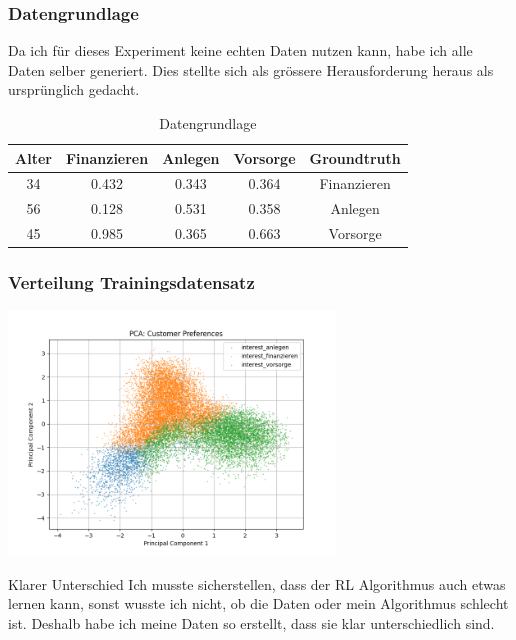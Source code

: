\documentclass{beamer}
\begin{document}
\begin{frame}  
\label{sec3}
  	\frametitle{Datengrundlage}
Da ich für dieses Experiment keine echten Daten nutzen kann, habe ich alle Daten selber generiert. Dies stellte sich als grössere Herausforderung heraus als ursprünglich gedacht.  

\begin{table}[ht]
\centering
\begin{tabular}{|c|c|c|c|c|}
\hline
Alter &  Finanzieren &  Anlegen &  Vorsorge & Groundtruth \\ \hline
 34 & 0.432 & 0.343 & 0.364 &  Finanzieren  \\ \hline
 56 & 0.128 & 0.531 & 0.358 &  Anlegen  \\ \hline
 45 & 0.985 & 0.365 & 0.663 &  Vorsorge  \\ \hline

\end{tabular}
\caption{Datengrundlage}
\end{table}
\end{frame}


\begin{frame}
\label{sec4}
  	\frametitle{Verteilung Trainingsdatensatz}
  \centering
  \includegraphics[width=0.65\textwidth]{figures/pca_groundtruth_s05.png}
  
  \begin{block}{Klarer Unterschied}
 Ich musste sicherstellen, dass der RL Algorithmus auch etwas lernen kann, sonst wusste ich nicht, ob die Daten oder mein Algorithmus schlecht ist. Deshalb habe ich meine Daten so erstellt, dass sie klar unterschiedlich sind.
  \end{block}
\end{frame}


%
\end{document}
